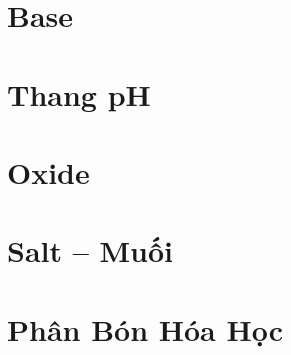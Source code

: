 \documentclass{article}
\begin{document}

\section{Base}


\section{Thang pH}


\section{Oxide}


\section{Salt -- Muối}


\section{Phân Bón Hóa Học}


\printbibliography[heading=bibintoc]
	
\end{document}
